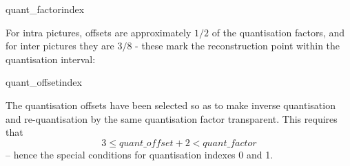 \begin{pseudo}{quant\_factor}{index}
\bsEND
\end{pseudo}

For intra pictures, offsets are approximately $1/2$ of the 
quantisation factors, and for inter pictures they are $3/8$ - these
mark the reconstruction point within the quantisation interval:

\begin{pseudo}{quant\_offset}{index}
\bsELSE
    \bsELSE
    \bsEND
  \bsELSE
  \bsEND
\bsEND
{}
\end{pseudo}

\begin{informative}
The quantisation offsets have been selected so as to make inverse quantisation
and re-quantisation by the same quantisation factor transparent. This requires that
\[3\leq quant\_offset+2<quant\_factor\] -- hence the special conditions for 
quantisation indexes 0 and 1.
\end{informative}
